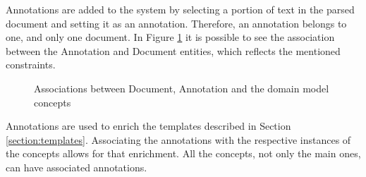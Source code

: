 Annotations are added to the system by selecting a portion of text in the parsed document and setting it as an annotation. Therefore, an annotation belongs to one, and only one document. In Figure \ref{figure:documentAnnotationConcepts} it is possible to see the association between the Annotation and Document entities, which reflects the mentioned constraints.

\begin{figure}[h]
\centering
\renewcommand {\umltextcolor}{black}
\renewcommand {\umlfillcolor}{none}
\renewcommand {\umldrawcolor}{black}

\caption{Associations between Document, Annotation and the domain model concepts}
\label{figure:documentAnnotationConcepts}
\end{figure}

Annotations are used to enrich the templates described in Section \ref{section:templates}. Associating the annotations with the respective instances of the concepts allows for that enrichment. All the concepts, not only the main ones, can have associated annotations.

